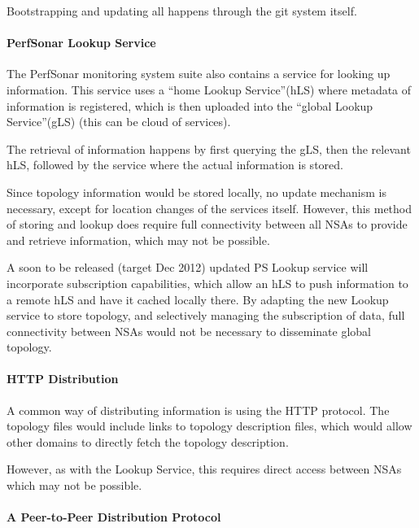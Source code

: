 \documentclass{article}
\begin{document}
Bootstrapping and updating all happens through the 
git system itself.


\paragraph{PerfSonar Lookup Service}

 The PerfSonar monitoring system suite also contains a service 
for looking up information. This service uses a ``home Lookup Service''(hLS) where 
metadata of information is registered, which is then uploaded into the ``global 
Lookup Service''(gLS) (this can be cloud of services).\label{h.pg14lxc0zu6o}


The retrieval of information happens by first querying 
the gLS, then the relevant hLS, followed by the service where the actual information 
is stored.\label{h.tjjrmby8htjk}


Since topology information would be stored locally, 
no update mechanism is necessary, except for location changes of the services itself. 
However, this method of storing and lookup does require full connectivity between 
all NSAs to provide and retrieve information, which may not be possible.


 A soon to be released (target Dec 2012) updated PS Lookup service 
will incorporate subscription capabilities, which allow an hLS to push information 
to a remote hLS and have it cached locally there. By adapting the new Lookup service 
to store topology, and selectively managing the subscription of data, full connectivity 
between NSAs would not be necessary to disseminate global topology.


\paragraph{HTTP Distribution}

 A common way of distributing information is using the HTTP protocol. 
The topology files would include links to topology description files, which would 
allow other domains to directly fetch the topology description.\label{h.efkcsmt7dwgr}


However, as with the Lookup Service, this requires 
direct access between NSAs which may not be possible.\label{h.mbgns4xsvbt4}


\paragraph{A Peer-to-Peer Distribution Protocol}
\end{document}
